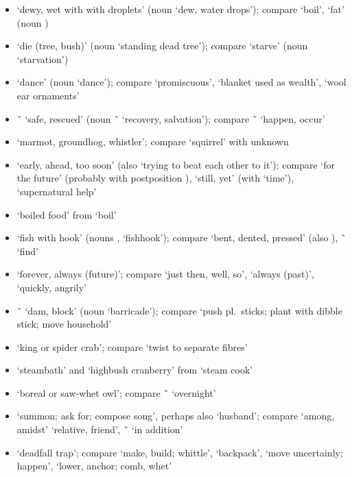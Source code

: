 \begin{morphdesc}[resume*=alphalist]
\begin{enumerate}
\begin{enumerate}
\begin{itemize}
			\item	{} ‘dewy, wet with with droplets’
				(noun  ‘dew, water drops’);
				compare  ‘boil’,
				 ‘fat’ (noun )
			\item	{} ‘die (tree, bush)’
				(noun  ‘standing dead tree’);
				compare  ‘starve’
				(noun  ‘starvation’)
			\item	{} ‘dance’
				(noun  ‘dance’);
				compare  ‘promiscuous’,
				 ‘blanket used as wealth’,
				 ‘wool ear ornaments’
			\item	{} \~\  ‘safe, rescued’
				(noun  \~\  ‘recovery, salvation’);
				compare  \~\  ‘happen, occur’
			\item	{} ‘marmot, groundhog, whistler’;
				compare  ‘squirrel’ with unknown 
			\item	{} ‘early, ahead, too soon’
				(also  ‘trying to beat each other to it’);
				compare  ‘for the future’
					(probably with postposition ),
				 ‘still, yet’ (with  ‘time’),
				 ‘supernatural help’
			\item	{} ‘boiled food’
				from  ‘boil’
			\item	{} ‘fish with hook’
				(nouns ,  ‘fishhook’);
				compare  ‘bent, dented, pressed’
					(also ),
				 \~\  ‘find’
			\item	{} ‘forever, always (future)’;
				compare  ‘just then, well, so’,
				 ‘always (past)’,
				 ‘quickly, angrily’
			\item	{} \~\  ‘dam, block’
				(noun  ‘barricade’);
				compare  ‘push pl.\ sticks; plant with dibble stick; move household’
			\item	{} ‘king or spider crab’;
				compare  ‘twist to separate fibres’
			\item	{} ‘steambath’
				and  ‘highbush cranberry’
				from  ‘steam cook’
			\item	{} ‘boreal or saw-whet owl’;
				compare  \~\  ‘overnight’
			\item	{} ‘summon; ask for; compose song’,
				perhaps also  ‘husband’;
				compare  ‘among, amidst’
				 ‘relative, friend’,
				 \~\  ‘in addition’
			\item	{} ‘deadfall trap’;
				compare  ‘make, build; whittle’,
				 ‘backpack’,
				 ‘move uncertainly; happen’,
				 ‘lower, anchor; comb, whet’
			\end{itemize}
		\end{enumerate}
	\end{enumerate}


\end{morphdesc}
